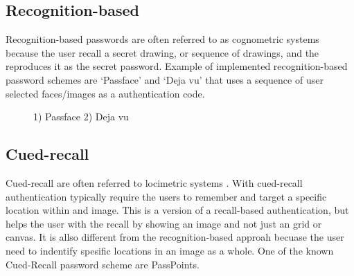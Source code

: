        
    \subsection{Recognition-based}
      Recognition-based passwords are often referred to as cognometric systems \cite{DeAngeli} because the user recall 
      a secret drawing, or sequence of drawings, and the reproduces it as the secret password. Example of implemented 
      recognition-based password schemes are `Passface' and `Deja vu' that uses a sequence of user selected faces/images as a authentication code.

      \begin{figure}[H]
        \centering
        \caption{1) Passface 2) Deja vu}
      \end{figure}

    \subsection{Cued-recall}
      Cued-recall are often referred to locimetric systems \cite{DeAngeli}. With cued-recall authentication typically 
      require the users to remember and target a specific location within and image. This is a version of a recall-based 
      authentication, but helps the user with the recall by showing an image and not just an grid or canvas. It is allso 
      different from the recognition-based approah becuase the user need to indentify spesific locations in an image as a whole. 
      One of the known Cued-Recall password scheme are PassPoints.

